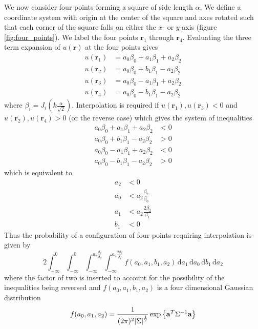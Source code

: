 \documentclass{report}
\newcommand{\rr}[0]{\mathbf{r}}
\newcommand{\ud}{\,\mathrm{d}}
\begin{document}
We now consider four points forming a square of side length $\alpha$. We define a coordinate system with origin at the center of the square and axes rotated such that each corner of the square falls on either the $x$- or $y$-axis (figure \ref{fig:four_points}). We label the four points $\rr_{1}$ through $\rr_{4}$. Evaluating the three term expansion of $u(\rr)$ at the four points gives
\begin{align*}
  u(\rr_{1}) & = a_{0} \beta_{0} + a_{1} \beta_{1} + a_{2} \beta_{2} \\
  u(\rr_{2}) & = a_{0} \beta_{0} + b_{1} \beta_{1} - a_{2} \beta_{2} \\
  u(\rr_{3}) & = a_{0} \beta_{0} - a_{1} \beta_{1} + a_{2} \beta_{2} \\
  u(\rr_{4}) & = a_{0} \beta_{0} - b_{1} \beta_{1} - a_{2} \beta_{2}
\end{align*}
where $\beta_{i} = J_{i} \left( k \frac{\alpha}{\sqrt{2}} \right)$. Interpolation is required if $u(\rr_{1}), u(\rr_{3}) < 0$ and $u(\rr_{2}), u(\rr_{4}) > 0$ (or the reverse case) which gives the system of inequalities
\begin{align*}
  a_{0} \beta_{0} + a_{1} \beta_{1} + a_{2} \beta_{2} & < 0 \\
  a_{0} \beta_{0} + b_{1} \beta_{1} - a_{2} \beta_{2} & > 0 \\
  a_{0} \beta_{0} - a_{1} \beta_{1} + a_{2} \beta_{2} & < 0 \\
  a_{0} \beta_{0} - b_{1} \beta_{1} - a_{2} \beta_{2} & > 0
\end{align*}
which is equivalent to
\begin{align*}
  a_{2} & < 0 \\
  a_{0} & < a_{2} \frac{\beta_{2}}{\beta_{0}} \\
  a_{1} & < a_{2} \frac{2 \beta_{2}}{\beta_{1}} \\
  b_{1} & < 0
\end{align*}
Thus the probability of a configuration of four points requiring interpolation is given by
\begin{equation}
  2 \int_{-\infty}^{0} \int_{-\infty}^{0} \int_{-\infty}^{a_{2} \frac{\beta_{2}}{\beta_{0}}} \int_{-\infty}^{a_{2} \frac{2 \beta_{2}}{\beta_{1}}} f(a_{0}, a_{1}, b_{1}, a_{2}) \ud a_{1} \ud a_{0} \ud b_{1} \ud a_{2}
\end{equation}
where the factor of two is inserted to account for the possibility of the inequalities being reversed and $f(a_{0}, a_{1}, b_{1}, a_{2})$ is a four dimensional Gaussian distribution
\[
f(a_{0}, a_{1}, a_{2}) = \frac{1}{(2 \pi)^{2} {\vert \Sigma \vert}^{\frac{1}{2}}} \exp{\left\{ {\bf a}^{T} \Sigma^{-1} {\bf a} \right\}}
\]
\end{document}
